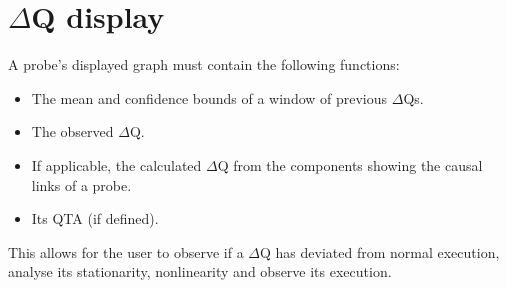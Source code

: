 \section{$\Delta$Q display}
    A probe's displayed graph must contain the following functions:
    \begin{itemize}
        \item The mean and confidence bounds of a window of previous $\Delta$Qs.
        \item The observed $\Delta$Q.
        \item If applicable, the calculated $\Delta$Q from the components showing the causal links of a probe.
        \item Its QTA (if defined).
    \end{itemize}
    This allows for the user to observe if a $\Delta$Q has deviated from normal execution, analyse its stationarity, nonlinearity and observe its execution.

